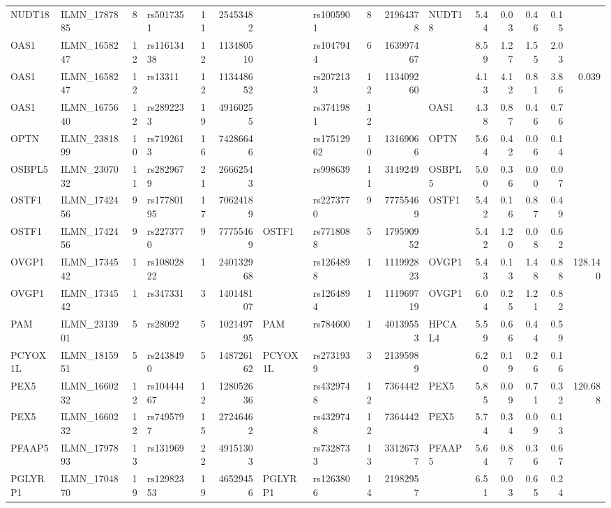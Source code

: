 \documentclass{article}
\begin{document}
\begin{landscape}
{\begin{ThreePartTable}
\begin{longtable}{|llr|lrrl|lrrl|rrrr|r|}
NUDT18 & ILMN\_1787885 & 8 & rs5017351 & 11 & 25453482 &  & rs1005901 & 8 & 21964378 & NUDT18 & 5.44 & 0.03 & 0.46 & 0.15 &  \\
OAS1 & ILMN\_1658247 & 12 & rs11613438 & 12 & 113480510 &  & rs1047944 & 6 & 163997467 &  & 8.59 & 1.27 & 1.55 & 2.03 &  \\
OAS1 & ILMN\_1658247 & 12 & rs13311 & 12 & 113448652 &  & rs2072133 & 12 & 113409260 &  & 4.13 & 4.12 & 0.81 & 3.86 & 0.039 \\
OAS1 & ILMN\_1675640 & 12 & rs2892233 & 19 & 49160255 &  & rs3741981 & 12 &  & OAS1 & 4.38 & 0.87 & 0.46 & 0.76 &  \\
OPTN & ILMN\_2381899 & 10 & rs7192613 & 16 & 74286646 &  & rs17512962 & 10 & 13169066 & OPTN & 5.64 & 0.42 & 0.06 & 0.14 &  \\
OSBPL5 & ILMN\_2307032 & 11 & rs2829679 & 21 & 26662543 &  & rs998639 & 11 & 3149249 & OSBPL5 & 5.00 & 0.36 & 0.00 & 0.07 &  \\
OSTF1 & ILMN\_1742456 & 9 & rs17780195 & 17 & 70624189 &  & rs2273770 & 9 & 77755469 & OSTF1 & 5.42 & 0.16 & 0.87 & 0.49 &  \\
OSTF1 & ILMN\_1742456 & 9 & rs2273770 & 9 & 77755469 & OSTF1 & rs7718088 & 5 & 179590952 &  & 5.42 & 1.20 & 0.08 & 0.62 &  \\
OVGP1 & ILMN\_1734542 & 1 & rs10802822 & 1 & 240132968 &  & rs1264898 & 1 & 111992823 & OVGP1 & 5.43 & 0.13 & 1.48 & 0.88 & 128.140 \\
OVGP1 & ILMN\_1734542 & 1 & rs347331 & 3 & 140148107 &  & rs1264894 & 1 & 111969719 & OVGP1 & 6.04 & 0.25 & 1.21 & 0.82 &  \\
PAM & ILMN\_2313901 & 5 & rs28092 & 5 & 102149795 & PAM & rs784600 & 1 & 40139553 & HPCAL4 & 5.59 & 0.66 & 0.44 & 0.59 &  \\
PCYOX1L & ILMN\_1815951 & 5 & rs2438490 & 5 & 148726162 & PCYOX1L & rs2731939 & 3 & 21395989 &  & 6.20 & 0.19 & 0.26 & 0.16 &  \\
PEX5 & ILMN\_1660232 & 12 & rs10444467 & 12 & 128052636 &  & rs4329748 & 12 & 7364442 & PEX5 & 5.85 & 0.09 & 0.71 & 0.32 & 120.688 \\
PEX5 & ILMN\_1660232 & 12 & rs7495797 & 15 & 27246462 &  & rs4329748 & 12 & 7364442 & PEX5 & 5.74 & 0.34 & 0.09 & 0.13 &  \\
PFAAP5 & ILMN\_1797893 & 13 & rs131969 & 22 & 49151303 &  & rs7328733 & 13 & 33126737 & PFAAP5 & 5.64 & 0.87 & 0.36 & 0.67 &  \\
PGLYRP1 & ILMN\_1704870 & 19 & rs12982353 & 19 & 46529456 & PGLYRP1 & rs1263806 & 14 & 21982957 &  & 6.51 & 0.03 & 0.65 & 0.24 &  \\

\end{longtable}
\end{ThreePartTable}}
\end{landscape}
\end{document}
